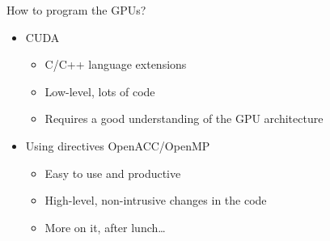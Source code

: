 \documentclass[aspectratio=169,12pt]{beamer}
\begin{document}
\begin{frame}{How to program the GPUs?}
  \begin{itemize}
  \item CUDA
    \begin{itemize}
    \item C/C++ language extensions
    \item Low-level, lots of code
    \item Requires a good understanding of the GPU architecture
    \end{itemize}
    \vspace\baselineskip
  \item Using directives OpenACC/OpenMP
    \begin{itemize}
    \item Easy to use and productive
    \item High-level, non-intrusive changes in the code
    \item More on it, after lunch\dots
    \end{itemize}
  \end{itemize}
\end{frame}


\end{document}
